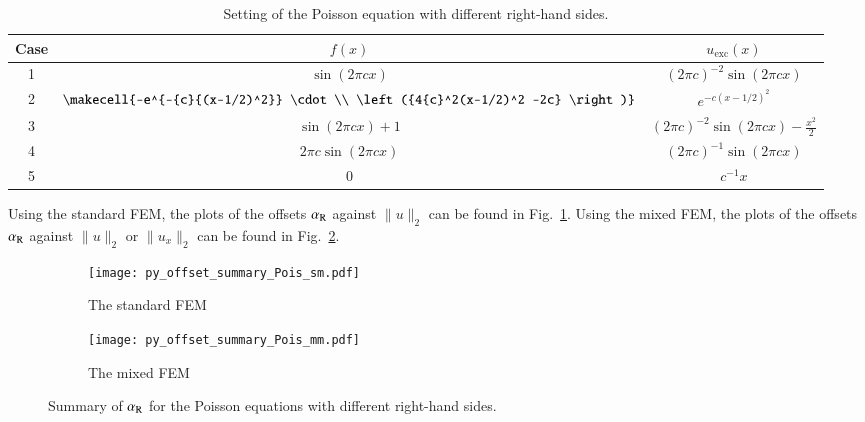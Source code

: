\documentclass[review,3p]{elsarticle}
\begin{document}
\begin{table}[!ht]
\centering
\caption [w]{Setting of the Poisson equation with different right-hand sides.} 
\label{scaling_cases_Poisson}
 \begin{tabular}{c c c} \hline      
Case & $f(x)$ & $u_{\text{exc}}(x)$ \\ \hline
1 & {$\sin (2 \pi cx)$} & ${(2 \pi c)}^{-2} \sin (2 \pi cx)$\\ \hline
2 & $\makecell{-e^{-{c}{(x-1/2)^2}} \cdot \\ \left({4{c}^2(x-1/2)^2 -2c} \right)}$ & $e^{-{c}{{(x-1/2)^2}}}$ \\ \hline
3 & $\sin (2 \pi c x) +1$ & ${(2 \pi c)}^{-2}\sin (2 \pi c x)-\frac{x^2}{2}$ \\ \hline
4 & $2 \pi c \sin (2 \pi c x)$ & ${(2 \pi c)}^{-1} \sin (2 \pi cx)$ \\ \hline
5 & $0$ & ${c}^{-1} x$ \\ \hline
\end{tabular}
\end{table}

Using the standard FEM, the plots of the offsets $\alpha_{\rm R}$ against $\|u\|_2$ can be found in Fig.~\ref{Fig:py_offset_summary_Pois_sm}.
Using the mixed FEM, the plots of the offsets $\alpha_{\rm R}$ against $\|u\|_2$ or $\|u_x\|_2$ can be found in Fig.~\ref{Fig:py_offset_summary_Pois_mm}. 

\begin{figure}[!ht]
	\hspace{2.5cm}
    \begin{subfigure}{5.4cm}
        \texttt{[image: py\_offset\_summary\_Pois\_sm.pdf]}
        \caption{The standard FEM}
        \label{Fig:py_offset_summary_Pois_sm}
    \end{subfigure}
    \hspace{-0.2cm}
    \begin{subfigure}{5.4cm}
        \texttt{[image: py\_offset\_summary\_Pois\_mm.pdf]}
        \caption{The mixed FEM}
        \label{Fig:py_offset_summary_Pois_mm}
    \end{subfigure}
\caption{Summary of $\alpha_{\rm R}$ for the Poisson equations with different right-hand sides.}
\label{Fig:py_offset_summary_Pois}
\end{figure}
\end{document}
